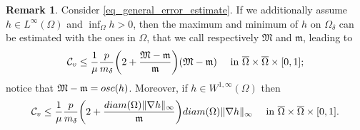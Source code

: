 \documentclass[11pt, reqno]{amsart}
\theoremstyle{definition}
\newtheorem{remark}[lemma]{Remark}
\numberwithin{equation}{section}
\newcommand{\mc}[1]{\mathcal{#1}}
\newcommand{\diam}{{\rm diam}}
\def\norm#1{\|#1\|}
\begin{document}
\begin{remark}
Consider \eqref{eq_general_error_estimate}. 
If we additionally assume $h \in L^{\infty}(\Omega)$ and $\inf_{\Omega} h >0$, then the maximum and minimum of $h$ on $\Omega_{\delta}$ can be estimated with the ones in $\Omega$, that we call respectively $\mathfrak{M}$ and $\mathfrak{m}$, leading to
$$\mc{C}_{v} \leq \frac{1}{\mu} \frac{p}{m_{\delta}} \bigg( 2 + \frac{\mathfrak{M}- \mathfrak{m}}{\mathfrak{m}}\bigg) (\mathfrak{M}-\mathfrak{m}) \quad \hbox{ in $ \overline{\Omega} \times \overline{\Omega} \times [0,1]$};$$
notice that $\mathfrak{M}-\mathfrak{m} = \textup{osc}(h)$.
Moreover, if $h \in W^{1,\infty}(\Omega)$ then
$$\mc{C}_{v} \leq \frac{1}{\mu} \frac{p}{m_{\delta}} \bigg( 2 + \frac{\diam(\Omega) \norm{\nabla h}_{\infty} }{\mathfrak{m}}\bigg) \diam(\Omega) \norm{\nabla h}_{\infty} \quad \hbox{ in $ \overline{\Omega} \times \overline{\Omega} \times [0,1]$}. $$
\end{remark}
\end{document}
